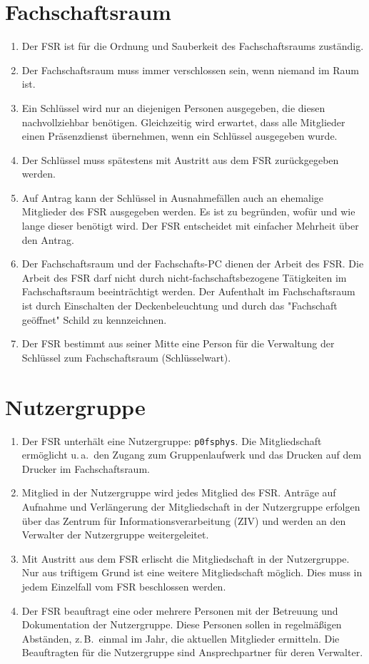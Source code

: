 \section{Fachschaftsraum}
\begin{enumerate}
	\item Der FSR ist für die Ordnung und Sauberkeit des Fachschaftsraums zuständig.
	\item Der Fachschaftsraum muss immer verschlossen sein, wenn niemand im Raum ist.
	\item Ein Schlüssel wird nur an diejenigen Personen ausgegeben, die diesen nachvollziehbar benötigen.
	Gleichzeitig wird erwartet, dass alle Mitglieder einen Präsenzdienst übernehmen, wenn ein Schlüssel ausgegeben wurde.
	\item Der Schlüssel muss spätestens mit Austritt aus dem FSR zurückgegeben werden.
	\item Auf Antrag kann der Schlüssel in Ausnahmefällen auch an ehemalige Mitglieder des FSR ausgegeben werden.
	Es ist zu begründen, wofür und wie lange dieser benötigt wird.
	Der FSR entscheidet mit einfacher Mehrheit über den Antrag.
	\item Der Fachschaftsraum und der Fachschafts-PC dienen der Arbeit des FSR. Die Arbeit des FSR darf nicht durch nicht-fachschaftsbezogene Tätigkeiten im Fachschaftsraum beeinträchtigt werden. Der Aufenthalt im Fachschaftsraum ist durch Einschalten der Deckenbeleuchtung und durch das "Fachschaft geöffnet" Schild zu kennzeichnen.
	\item Der FSR bestimmt aus seiner Mitte eine Person für die Verwaltung der Schlüssel zum Fachschaftsraum (Schlüsselwart).
\end{enumerate}

\section{Nutzergruppe}
\begin{enumerate}
	\item Der FSR unterhält eine Nutzergruppe: \texttt{p0fsphys}.
	Die Mitgliedschaft ermöglicht u.\,a.\ den Zugang zum Gruppenlaufwerk und das Drucken auf dem Drucker im Fachschaftsraum.
	\item Mitglied in der Nutzergruppe wird jedes Mitglied des FSR.
	Anträge auf Aufnahme und Verlängerung der Mitgliedschaft in der Nutzergruppe erfolgen über das Zentrum für Informationsverarbeitung (ZIV) und werden an den Verwalter der Nutzergruppe weitergeleitet.
	\item Mit Austritt aus dem FSR erlischt die Mitgliedschaft in der Nutzergruppe.
	Nur aus triftigem Grund ist eine weitere Mitgliedschaft möglich.
	Dies muss in jedem Einzelfall vom FSR beschlossen werden.
	\item Der FSR beauftragt eine oder mehrere Personen mit der Betreuung und Dokumentation der Nutzergruppe.
	Diese Personen sollen in regelmäßigen Abständen, z.\,B.\ einmal im Jahr, die aktuellen Mitglieder ermitteln.
	Die Beauftragten für die Nutzergruppe sind Ansprechpartner für deren Verwalter.
\end{enumerate}

